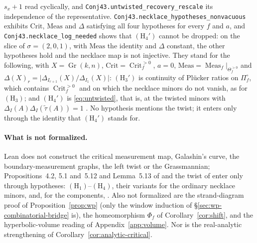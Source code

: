 \documentclass[11pt]{article}
\theoremstyle{definition}
\DeclareMathOperator{\Gr}{Gr}
\DeclareMathOperator{\Meas}{Meas}
\DeclareMathOperator{\Crit}{Crit}
\newcommand{\Thef}{\Theta_f^{>0}}
\newcommand{\Critf}{\Crit_f^{>0}}
\begin{document}
$s_x+1$ read cyclically, and \texttt{Conj43.\allowbreak untwisted\_\allowbreak recovery\_\allowbreak rescale} its independence of the representative.
\texttt{Conj43.\allowbreak necklace\_\allowbreak hypotheses\_\allowbreak nonvacuous} exhibits $\mathrm{Crit}$, $\mathrm{Meas}$ and $\Delta$ satisfying all four
hypotheses for every $f$ and $a$, and \texttt{Conj43.\allowbreak necklace\_\allowbreak log\_\allowbreak needed} shows that $(\mathrm H_4')$ cannot be dropped: on the
slice of $\sigma=(2,0,1)$, with $\mathrm{Meas}$ the identity and $\Delta$ constant, the other hypotheses hold and the
necklace map is not injective. They stand for the following, with $X=\Gr(k,n)$, $\mathrm{Crit}=\Critf$, $a=0$,
$\mathrm{Meas}=\Meas_f|_{\Thef}$ and $\Delta(X)_r=\lvert\Delta_{I_{r+1}}(X)/\Delta_{I_1}(X)\rvert$:
$(\mathrm H_3')$ is continuity of Pl\"ucker ratios on $\Pi_f^\circ$, which contains $\Critf$ and on which the
necklace minors do not vanish, as for $(\mathrm H_3)$; and $(\mathrm H_4')$ is \eqref{eq:untwisted}, that is,
\cite[Prop.~5.12]{Galashin} at the twisted minors with $\Delta_I(A)\Delta_I(\widetilde\tau(A))=1$
\cite[proof of Prop.~5.4]{Galashin}. No hypothesis mentions the twist; it enters only through the identity that
$(\mathrm H_4')$ stands for.

\paragraph{What is not formalized.}
Lean does not construct the critical measurement map, Galashin's curve, the boundary-measurement graphs,
the left twist or the Grassmannian; Propositions~4.2, 5.1 and~5.12 and Lemma~5.13 of \cite{Galashin} and
the twist of \cite{MullerSpeyer} enter only through hypotheses: $(\mathrm H_1)$--$(\mathrm H_4)$, their variants
for the ordinary necklace minors, and, for the components, \cite[Prop.~4.10]{Galashin}. Also not formalized
are the strand-diagram proof of Proposition~\ref{prop:wp} (only the window induction of
\S\ref{sec:wp-combinatorial-bridge} is),
the homeomorphism $\Phi_f$ of Corollary~\ref{cor:shift}, and the hyperbolic-volume reading
of Appendix~\ref{app:volume}.
Nor is the real-analytic strengthening of Corollary~\ref{cor:analytic-critical}.
\end{document}
